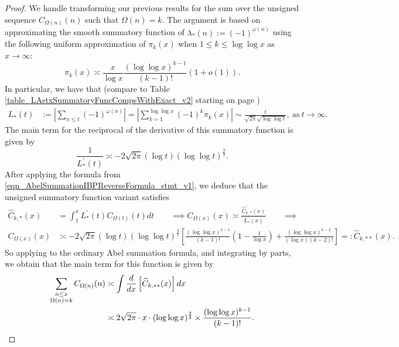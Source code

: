 \documentclass[11pt,reqno,a4letter]{article}
\numberwithin{figure}{section}
\numberwithin{table}{section}
\theoremstyle{plain}
\numberwithin{theorem}{section}
\theoremstyle{definition}
\begin{document}
\begin{proof}
We handle transforming our previous results for the sum over the unsigned sequence 
$C_{\Omega(n)}(n)$ such that $\Omega(n) = k$. 
The argument is based on approximating the smooth summatory function of 
$\lambda_{\ast}(n) := (-1)^{\omega(n)}$ using the following 
uniform approximation of $\pi_k(x)$ when $1 \leq k \leq \log\log x$ as 
$x \rightarrow \infty$: 
\[
\pi_k(x) \asymp \frac{x}{\log x} \frac{(\log\log x)^{k-1}}{(k-1)!} (1 + o(1)). 
\]
In particular, we have that 
(compare to Table \ref{table_LAstxSummatoryFuncCompsWithExact_v2} starting on page 
\pageref{table_LAstxSummatoryFuncCompsWithExact_v2}) 
\begin{align*} 
L_{\ast}(t) & := \left\lvert \sum_{n \leq t} (-1)^{\omega(n)} \right\rvert = 
     \left\lvert \sum_{k=1}^{\log\log x} (-1)^{k} \pi_k(x) \right\rvert \sim 
     \frac{t}{\sqrt{2\pi} \sqrt{\log\log t}}, \mathrm{\ as\ } t \rightarrow \infty. 
\end{align*} 
The main term for the reciprocal of the derivative of this summatory function is given by 
\[
\frac{1}{L_{\ast}^{\prime}(t)} \asymp -2\sqrt{2\pi} (\log t) (\log\log t)^{\frac{3}{2}}. 
\]
After applying the formula from \eqref{eqn_AbelSummationIBPReverseFormula_stmt_v1},  
we deduce that the unsigned summatory function variant satisfies 
\begin{align*} 
\widehat{C}_{k,\ast}(x) & = \int_1^{x} L_{\ast}^{\prime}(t) C_{\Omega(t)}(t) dt \qquad \implies 
C_{\Omega(x)}(x) \asymp \frac{\widehat{C}_{k,\ast}^{\prime}(x)}{L_{\ast}^{\prime}(x)} \qquad \implies \\ 
C_{\Omega(x)}(x) & \asymp -2\sqrt{2\pi} (\log t) (\log\log t)^{\frac{3}{2}} 
     \left[\frac{(\log\log x)^{k-1}}{(k-1)!} \left(1 - 
     \frac{1}{\log x}\right) + \frac{(\log\log x)^{k-2}}{(\log x) (k-2)!}\right] 
     =: \widehat{C}_{k,\ast\ast}(x). 
\end{align*} 
So applying to the ordinary Abel summation formula, and integrating by parts, we obtain that 
the main term for this function is given by 
\begin{align*} 
\sum_{\substack{n \leq x \\ \Omega(n)=k}} C_{\Omega(n)}(n) & \asymp 
     \int \frac{d}{dx}\left[\widehat{C}_{k,\ast\ast}(x)\right] dx \\ 
     & \asymp 2\sqrt{2\pi} \cdot x \cdot (\log\log x)^{\frac{3}{2}} \times 
     \frac{(\log\log x)^{k-1}}{(k-1)!}. 
     \qedhere 
\end{align*} 
\end{proof}
\end{document}
